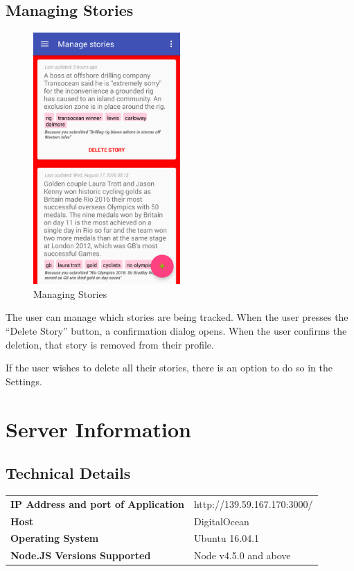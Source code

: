 \documentclass[11pt,titlepage]{report}
\begin{document}
\section{Managing Stories}
\begin{figure}
	\vspace{-1cm}
	\begin{center}
		\includegraphics[width=0.5\textwidth]{img/manageStories.png}
	\end{center}
	\caption{Managing Stories}
	\vspace{-2.5cm}
\end{figure}
The user can manage which stories are being tracked. When the user presses the ``Delete Story'' button, a confirmation dialog opens. When the user confirms the deletion, that story is removed from their profile. 

If the user wishes to delete all their stories, there is an option to do so in the Settings.

\chapter{Server Information}\label{appendix:serverInfo}
\section{Technical Details}
\renewcommand{\arraystretch}{1.5}
\begin{tabular}{>{\bfseries}l l}
IP Address and port of Application & http://139.59.167.170:3000/ \\
Host & DigitalOcean \\
Operating System & Ubuntu 16.04.1 \\
Node.JS Versions Supported & Node v4.5.0 and above
\end{tabular}
\end{document}
